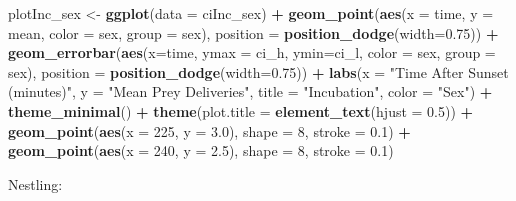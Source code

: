 \documentclass[]{article}
\newenvironment{Shaded}{\begin{snugshade}}{\end{snugshade}}
\newcommand{\DataTypeTok}[1]{\textcolor[rgb]{0.13,0.29,0.53}{#1}}
\newcommand{\DecValTok}[1]{\textcolor[rgb]{0.00,0.00,0.81}{#1}}
\newcommand{\FloatTok}[1]{\textcolor[rgb]{0.00,0.00,0.81}{#1}}
\newcommand{\KeywordTok}[1]{\textcolor[rgb]{0.13,0.29,0.53}{\textbf{#1}}}
\newcommand{\NormalTok}[1]{#1}
\newcommand{\OperatorTok}[1]{\textcolor[rgb]{0.81,0.36,0.00}{\textbf{#1}}}
\newcommand{\StringTok}[1]{\textcolor[rgb]{0.31,0.60,0.02}{#1}}
\begin{document}
\begin{Shaded}
\begin{Highlighting}[]
\NormalTok{plotInc_sex <-}\StringTok{ }\KeywordTok{ggplot}\NormalTok{(}\DataTypeTok{data =}\NormalTok{ ciInc_sex) }\OperatorTok{+}
\StringTok{  }\KeywordTok{geom_point}\NormalTok{(}\KeywordTok{aes}\NormalTok{(}\DataTypeTok{x =}\NormalTok{ time, }\DataTypeTok{y =}\NormalTok{ mean, }\DataTypeTok{color =}\NormalTok{ sex, }\DataTypeTok{group =}\NormalTok{ sex),}
             \DataTypeTok{position =} \KeywordTok{position_dodge}\NormalTok{(}\DataTypeTok{width=}\FloatTok{0.75}\NormalTok{)) }\OperatorTok{+}
\StringTok{  }\KeywordTok{geom_errorbar}\NormalTok{(}\KeywordTok{aes}\NormalTok{(}\DataTypeTok{x=}\NormalTok{time, }\DataTypeTok{ymax =}\NormalTok{ ci_h, }\DataTypeTok{ymin=}\NormalTok{ci_l, }\DataTypeTok{color =}\NormalTok{ sex, }
                    \DataTypeTok{group =}\NormalTok{ sex),}
                \DataTypeTok{position =} \KeywordTok{position_dodge}\NormalTok{(}\DataTypeTok{width=}\FloatTok{0.75}\NormalTok{)) }\OperatorTok{+}
\StringTok{  }\KeywordTok{labs}\NormalTok{(}\DataTypeTok{x =} \StringTok{"Time After Sunset (minutes)"}\NormalTok{, }\DataTypeTok{y =} \StringTok{"Mean Prey Deliveries"}\NormalTok{, }
       \DataTypeTok{title =} \StringTok{"Incubation"}\NormalTok{, }\DataTypeTok{color =} \StringTok{"Sex"}\NormalTok{) }\OperatorTok{+}
\StringTok{  }\KeywordTok{theme_minimal}\NormalTok{() }\OperatorTok{+}
\StringTok{  }\KeywordTok{theme}\NormalTok{(}\DataTypeTok{plot.title =} \KeywordTok{element_text}\NormalTok{(}\DataTypeTok{hjust =} \FloatTok{0.5}\NormalTok{)) }\OperatorTok{+}
\StringTok{  }\KeywordTok{geom_point}\NormalTok{(}\KeywordTok{aes}\NormalTok{(}\DataTypeTok{x =} \DecValTok{225}\NormalTok{, }\DataTypeTok{y =} \FloatTok{3.0}\NormalTok{), }\DataTypeTok{shape =} \DecValTok{8}\NormalTok{, }\DataTypeTok{stroke =} \FloatTok{0.1}\NormalTok{) }\OperatorTok{+}
\StringTok{  }\KeywordTok{geom_point}\NormalTok{(}\KeywordTok{aes}\NormalTok{(}\DataTypeTok{x =} \DecValTok{240}\NormalTok{, }\DataTypeTok{y =} \FloatTok{2.5}\NormalTok{), }\DataTypeTok{shape =} \DecValTok{8}\NormalTok{, }\DataTypeTok{stroke =} \FloatTok{0.1}\NormalTok{)}
\end{Highlighting}
\end{Shaded}

Nestling:
\end{document}
